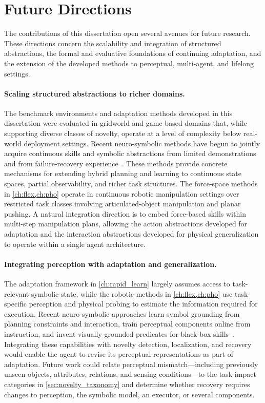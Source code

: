 \section{Future Directions}
\label{sec:future_directions}

The contributions of this dissertation open several avenues for future research. These directions concern the scalability and integration of structured abstractions, the formal and evaluative foundations of continuing adaptation, and the extension of the developed methods to perceptual, multi-agent, and lifelong settings.



\paragraph{Scaling structured abstractions to richer domains.}
The benchmark environments and adaptation methods developed in this dissertation were evaluated in gridworld and game-based domains that, while supporting diverse classes of novelty, operate at a level of complexity below real-world deployment settings. Recent neuro-symbolic methods have begun to jointly acquire continuous skills and symbolic abstractions from limited demonstrations and from failure-recovery experience~\citep{lorang2025fewshot,li2026recover}. These methods provide concrete mechanisms for extending hybrid planning and learning to continuous state spaces, partial observability, and richer task structures. The force-space methods in \cref{ch:flex,ch:pho} operate in continuous robotic manipulation settings over restricted task classes involving articulated-object manipulation and planar pushing. A natural integration direction is to embed force-based skills within multi-step manipulation plans, allowing the action abstractions developed for adaptation and the interaction abstractions developed for physical generalization to operate within a single agent architecture.

\paragraph{Integrating perception with adaptation and generalization.}
The adaptation framework in \cref{ch:rapid_learn} largely assumes access to task-relevant symbolic state, while the robotic methods in \cref{ch:flex,ch:pho} use task-specific perception and physical probing to estimate the information required for execution. Recent neuro-symbolic approaches learn symbol grounding from planning constraints and interaction, train perceptual components online from instruction, and invent visually grounded predicates for black-box skills~\citep{lymperopoulos2025acttoground,schneider2025instruction,yang2025skillwrapper}. Integrating these capabilities with novelty detection, localization, and recovery would enable the agent to revise its perceptual representations as part of adaptation. Future work could relate perceptual mismatch---including previously unseen objects, attributes, relations, and sensing conditions---to the task-impact categories in \cref{sec:novelty_taxonomy} and determine whether recovery requires changes to perception, the symbolic model, an executor, or several components.

